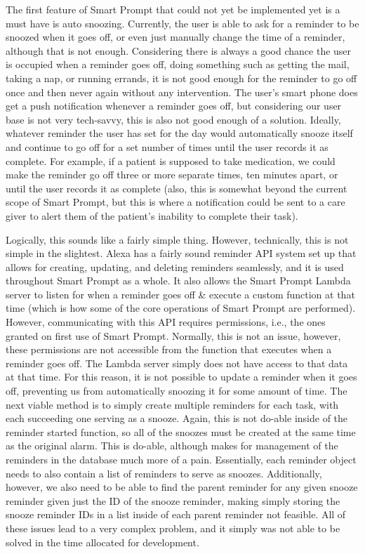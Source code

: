 \documentclass[11pt, oneside]{article}
\begin{document}
The first feature of Smart Prompt that could not yet be implemented yet is a must have is auto snoozing. 
Currently, the user is able to ask for a reminder to be snoozed when it goes off, or even just manually change the time of a reminder, although that is not enough. 
Considering there is always a good chance the user is occupied when a reminder goes off, doing something such as getting the mail, taking a nap, or running errands, it is not good enough for the reminder to go off once and then never again without any intervention. 
The user's smart phone does get a push notification whenever a reminder goes off, but considering our user base is not very tech-savvy, this is also not good enough of a solution. 
Ideally, whatever reminder the user has set for the day would automatically snooze itself and continue to go off for a set number of times until the user records it as complete. 
For example, if a patient is supposed to take medication, we could make the reminder go off three or more separate times, ten minutes apart, or until the user records it as complete (also, this is somewhat beyond the current scope of Smart Prompt, but this is where a notification could be sent to a care giver to alert them of the patient's inability to complete their task).

Logically, this sounds like a fairly simple thing. 
However, technically, this is not simple in the slightest. 
Alexa has a fairly sound reminder API system set up that allows for creating, updating, and deleting reminders seamlessly, and it is used throughout Smart Prompt as a whole. 
It also allows the Smart Prompt Lambda server to listen for when a reminder goes off \& execute a custom function at that time (which is how some of the core operations of Smart Prompt are performed).
However, communicating with this API requires permissions, i.e., the ones granted on first use of Smart Prompt. 
Normally, this is not an issue, however, these permissions are not accessible from the function that executes when a reminder goes off. 
The Lambda server simply does not have access to that data at that time. 
For this reason, it is not possible to update a reminder when it goes off, preventing us from automatically snoozing it for some amount of time. 
The next viable method is to simply create multiple reminders for each task, with each succeeding one serving as a snooze. 
Again, this is not do-able inside of the reminder started function, so all of the snoozes must be created at the same time as the original alarm. 
This is do-able, although makes for management of the reminders in the database much more of a pain. 
Essentially, each reminder object needs to also contain a list of reminders to serve as snoozes. 
Additionally, however, we also need to be able to find the parent reminder for any given snooze reminder given just the ID of the snooze reminder, making simply storing the snooze reminder IDs in a list inside of each parent reminder not feasible. 
All of these issues lead to a very complex problem, and it simply was not able to be solved in the time allocated for development. 
\end{document}
